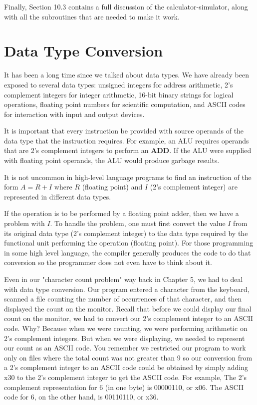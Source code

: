 \documentclass{patt}
\begin{document}
Finally, Section 10.3 contains a full discussion of the 
calculator-simulator, along with all the subroutines that are needed 
to make it work.

\FloatBarrier
\section{Data Type Conversion}

It has been a long time since we talked about data types.  We have already 
been exposed to several data types: unsigned integers for address
arithmetic, 2's complement integers for integer arithmetic, 16-bit
binary strings for logical operations, floating point numbers for
scientific computation, and ASCII codes for interaction with input and
output devices.

It is important that every instruction be provided with source
operands of the data type that the instruction requires. For example,
an ALU requires operands that are 2's complement integers to perform
an {\bf ADD}. If the ALU were supplied with floating point operands, the 
ALU would produce garbage results.

It is not uncommon in high-level language programs to find an
instruction of the form $A=R+I$ where $R$ (floating point) and $I$
(2's complement integer) are represented in different data types.

If the operation is to be performed by a floating point adder, then we
have a problem with $I$. To handle the problem, one must first convert
the value $I$ from its original data type (2's complement integer)
to the data type required by the functional unit performing the operation 
(floating point).  For those programming in some high level language, 
the compiler generally produces the code to do that conversion so the 
programmer does not even have to think about it.

Even in our "character count problem" way back in Chapter 5, we had to deal
with data type conversion.  Our program entered a character from the
keyboard, scanned a file counting the number of occurrences of that character,
and then displayed the count on the monitor.  Recall that before we could
display our final count on the monitor, we had to convert our 2's complement 
integer to an ASCII code.  Why?  Because when we were counting, we were 
performing arithmetic on 2's complement integers.  But when we were 
displaying, we needed to represent our count as an ASCII code.  You remember 
we restricted our program to work only on files where the total count was not 
greater than 9 so our conversion from a 2's complement integer to an ASCII code 
could be obtained by simply adding x30 to the 2's complement integer to get the 
ASCII code.  For example, The 2's complement representation for 6 (in one byte)
is 00000110, or x06.  The ASCII code for 6, on the other hand, is 00110110, 
or x36.
  
\end{document}
